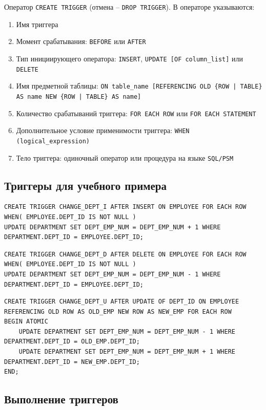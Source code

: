 \documentclass[a4paper,12pt]{article}
\begin{document}
Оператор \texttt{CREATE TRIGGER} (отмена – \texttt{DROP TRIGGER}). В операторе указываются:
\begin{enumerate}
    \item Имя триггера
    \item Момент срабатывания: \texttt{BEFORE} или \texttt{AFTER}
    \item Тип инициирующего оператора: \texttt{INSERT}, \texttt{UPDATE [OF column\_list]} или \texttt{DELETE}
    \item Имя предметной таблицы: \texttt{ON table\_name [REFERENCING OLD \{ROW | TABLE\} AS name NEW \{ROW | TABLE\} AS name]}
    \item Количество срабатываний триггера: \texttt{FOR EACH ROW} или \texttt{FOR EACH STATEMENT}
    \item Дополнительное условие применимости триггера: \texttt{WHEN (logical\_expression)}
    \item Тело триггера: одиночный оператор или процедура на языке \texttt{SQL/PSM}
\end{enumerate}

\subsection{Триггеры для учебного примера}

\begin{lstlisting}
CREATE TRIGGER CHANGE_DEPT_I AFTER INSERT ON EMPLOYEE FOR EACH ROW
WHEN( EMPLOYEE.DEPT_ID IS NOT NULL )
UPDATE DEPARTMENT SET DEPT_EMP_NUM = DEPT_EMP_NUM + 1 WHERE DEPARTMENT.DEPT_ID = EMPLOYEE.DEPT_ID;
\end{lstlisting}

\begin{lstlisting}
CREATE TRIGGER CHANGE_DEPT_D AFTER DELETE ON EMPLOYEE FOR EACH ROW
WHEN( EMPLOYEE.DEPT_ID IS NOT NULL )
UPDATE DEPARTMENT SET DEPT_EMP_NUM = DEPT_EMP_NUM - 1 WHERE DEPARTMENT.DEPT_ID = EMPLOYEE.DEPT_ID;
\end{lstlisting}

\begin{lstlisting}
CREATE TRIGGER CHANGE_DEPT_U AFTER UPDATE OF DEPT_ID ON EMPLOYEE
REFERENCING OLD ROW AS OLD_EMP NEW ROW AS NEW_EMP FOR EACH ROW
BEGIN ATOMIC
    UPDATE DEPARTMENT SET DEPT_EMP_NUM = DEPT_EMP_NUM - 1 WHERE DEPARTMENT.DEPT_ID = OLD_EMP.DEPT_ID;
    UPDATE DEPARTMENT SET DEPT_EMP_NUM = DEPT_EMP_NUM + 1 WHERE DEPARTMENT.DEPT_ID = NEW_EMP.DEPT_ID;
END;
\end{lstlisting}

\subsection{Выполнение триггеров}
\end{document}

